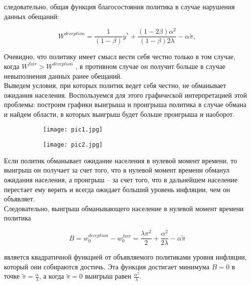 следовательно, общая функция благосостояния политика в случае нарушения данных обещаний:

\begin{equation}
W^{deception} = \frac{1}{(1-\beta)}y^*+\frac{(1-2\beta)\alpha^2}{(1-\beta)2\lambda}-\alpha\tilde{\pi},
\end{equation}

Очевидно, что политику имеет смысл вести себя честно только в том случае, когда  $W^{fair} > W^{deception}$ , в противном случае он получит больше в случае невыполнения данных ранее обещаний.
\\

Выведем условия, при которых политик ведет себя честно, не обманывает ожидания населения. Воспользуемся для этого графической интерпретацией этой проблемы: построим графики выигрыша и проигрыша политика в случае обмана и найдем области, в которых выигрыш будет больше проигрыша и наоборот.

\begin{figure}[h]
	
	\begin{subfigure}{0.5\textwidth}
		\texttt{[image: pic1.jpg]} 
		\caption{}
		\label{fig:pic1}
	\end{subfigure}
	\begin{subfigure}{0.5\textwidth}
		\texttt{[image: pic2.jpg]}
		\caption{}
		\label{fig:pic2}
	\end{subfigure}
	
	\caption{}
	\label{fig:image2}
\end{figure}

Если политик обманывает ожидание населения в нулевой момент времени, то выигрыш он получает за счет того, что в нулевой момент времени обманул ожидания населения, а проигрыш – за счет того, что в дальнейшем население перестает ему верить и всегда ожидает больший уровень инфляции, чем он объявляет.
\\

Следовательно, выигрыш обманывающего население в нулевой момент времени политика

\begin{equation}
B=w^{deception}_0 - w^{fair}_0 = \frac{\lambda\pi^2}{2}+\frac{\alpha^2}{2\lambda}-\alpha\tilde{\pi}
\end{equation}

является квадратичной функцией от объявляемого политиками уровня инфляции, который они собираются достичь. Эта функция достигает минимума $B=0$  в точке $\tilde{\pi}=\frac{\alpha}{\lambda}$, а когда $\tilde{\pi}=0$  выигрыш равен $\frac{\alpha^2}{\lambda}$.
\\

